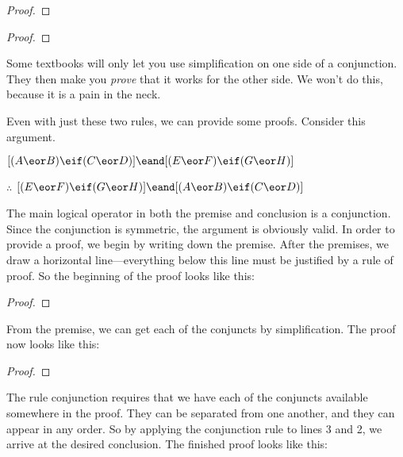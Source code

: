 \begin{multicols}{2}
\begin{proof}
 
\end{proof}

\begin{proof}
 
\end{proof}
\end{multicols}
Some textbooks will only let you use simplification on one side of a conjunction. They then make you \emph{prove} that it works for the other side. We won't do this, because it is a pain in the neck. 

Even with just these two rules, we can provide some proofs. Consider this argument.
\begin{earg}
\item[] $[(A\eor B)\eif(C\eor D)] \eand [(E \eor F) \eif (G\eor H)]$
\item[$\therefore$] $[(E \eor F) \eif (G\eor H)] \eand [(A\eor B)\eif(C\eor D)]$
\end{earg}
The main logical operator in both the premise and conclusion is a conjunction. Since the conjunction is symmetric, the argument is obviously valid. In order to provide a proof, we begin by writing down the premise. After the premises, we draw a horizontal line---everything below this line must be justified by a rule of proof. So the beginning of the proof looks like this:

\begin{proof}
\end{proof}

From the premise, we can get each of the conjuncts by simplification. The proof now looks like this:

\begin{proof}
	 
	 
\end{proof}

The rule conjunction requires that we have each of the conjuncts available somewhere in the proof. They can be separated from one another, and they can appear in any order. So by applying the conjunction rule to lines 3 and 2, we arrive at the desired conclusion. The finished proof looks like this:

